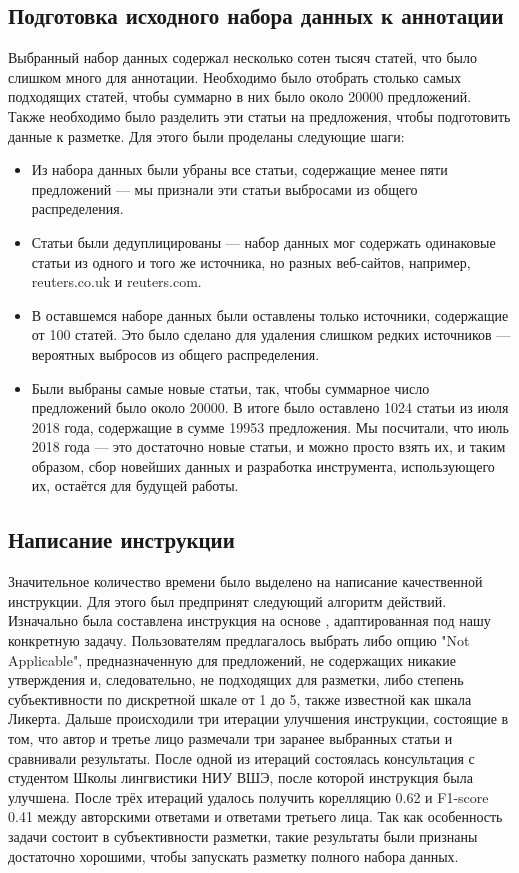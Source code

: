 \documentclass[conference]{IEEEtran}
\begin{document}
\subsection{Подготовка исходного набора данных к аннотации}
Выбранный набор данных содержал несколько сотен тысяч статей, что было слишком много для аннотации. Необходимо было отобрать столько самых подходящих статей, чтобы суммарно в них было около 20000 предложений. Также необходимо было разделить эти статьи на предложения, чтобы подготовить данные к разметке. Для этого были проделаны следующие шаги:
\begin{itemize}
    \item Из набора данных были убраны все статьи, содержащие менее пяти предложений --- мы признали эти статьи выбросами из общего распределения.
    \item Статьи были дедуплицированы --- набор данных мог содержать одинаковые статьи из одного и того же источника, но разных веб-сайтов, например, reuters.co.uk и reuters.com.
    \item В оставшемся наборе данных были оставлены только источники, содержащие от 100 статей. Это было сделано для удаления слишком редких источников --- вероятных выбросов из общего распределения.
    \item Были выбраны самые новые статьи, так, чтобы суммарное число предложений было около 20000. В итоге было оставлено 1024 статьи из июля 2018 года, содержащие в сумме 19953 предложения. Мы посчитали, что июль 2018 года --- это достаточно новые статьи, и можно просто взять их, и таким образом, сбор новейших данных и разработка инструмента, использующего их, остаётся для будущей работы.
\end{itemize}

\subsection{Написание инструкции}
Значительное количество времени было выделено на написание качественной инструкции. Для этого был предпринят следующий алгоритм действий. Изначально была составлена инструкция на основе \cite{annotating-private-states}, адаптированная под нашу конкретную задачу. Пользователям предлагалось выбрать либо опцию "Not Applicable", предназначенную для предложений, не содержащих никакие утверждения и, следовательно, не подходящих для разметки, либо степень субъективности по дискретной шкале от 1 до 5, также известной как шкала Ликерта. Дальше происходили три итерации улучшения инструкции, состоящие в том, что автор и третье лицо размечали три заранее выбранных статьи и сравнивали результаты. После одной из итераций состоялась консультация с студентом Школы лингвистики НИУ ВШЭ, после которой инструкция была улучшена. После трёх итераций удалось получить корелляцию 0.62 и F1-score 0.41 между авторскими ответами и ответами третьего лица. Так как особенность задачи состоит в субъективности разметки, такие результаты были признаны достаточно хорошими, чтобы запускать разметку полного набора данных.
\end{document}
